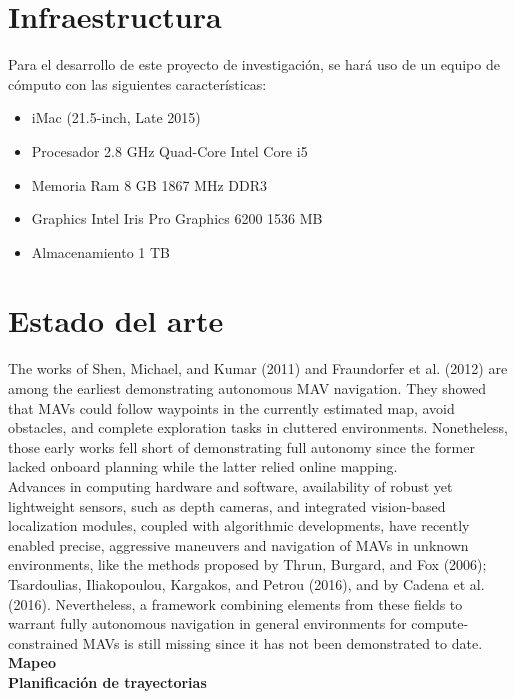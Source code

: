 \documentclass[11pt,epsf,times]{article}
\begin{document}
\section*{Infraestructura}

Para el desarrollo de este proyecto de investigaci\'{o}n, se har\'{a} uso de un equipo de c\'{o}mputo con las siguientes caracter\'{i}sticas:

\begin{itemize}
\item iMac (21.5-inch, Late 2015)
\item Procesador 2.8 GHz Quad-Core Intel Core i5
\item Memoria Ram 8 GB 1867 MHz DDR3
\item Graphics Intel Iris Pro Graphics 6200 1536 MB
\item Almacenamiento 1 TB
\end{itemize}

\newpage
\section*{Estado del arte}

The works of Shen, Michael, and Kumar (2011) and Fraundorfer et al. (2012) are among the earliest demonstrating autonomous MAV navigation. They showed that MAVs could follow waypoints in the currently estimated map, avoid obstacles, and complete exploration tasks in cluttered environments. Nonetheless, those early works fell short of demonstrating full autonomy since the former lacked onboard planning while the latter relied online mapping.\\

Advances in computing hardware and software, availability of robust yet lightweight sensors, such as depth cameras, and integrated vision-based localization modules, coupled with algorithmic developments, have recently enabled precise, aggressive maneuvers and navigation of MAVs in unknown environments, like the methods proposed by Thrun, Burgard, and Fox (2006); Tsardoulias, Iliakopoulou, Kargakos, and Petrou (2016), and by Cadena et al. (2016). Nevertheless, a framework combining elements from these fields to warrant fully autonomous navigation in general environments for compute-constrained MAVs is still missing since it has not been demonstrated to date.\\

\textbf{Mapeo}\\

\textbf{Planificaci\'{o}n de trayectorias}\\
\end{document}
